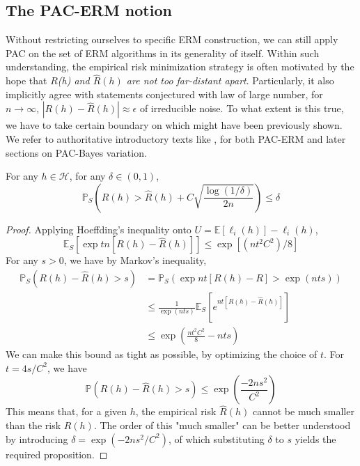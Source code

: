 \subsection{The PAC-ERM notion}

Without restricting ourselves to specific ERM construction, we can still apply PAC on the set of ERM algorithms in its generality of itself. Within such understanding, the empirical risk minimization strategy is often motivated by the hope that \textit{$R$(h) and $\hat{R}(h)$ are not too far-distant apart}. Particularly, it also implicitly agree with statements conjectured with law of large number, for $n\to\infty$, $|R(h)-\hat{R}(h)|\approx \epsilon$ of irreducible noise. To what extent is this true, we have to take certain boundary on which might have been previously shown. We refer to authoritative introductory texts like \cite{Alquier_2024}, for both PAC-ERM and later sections on PAC-Bayes variation. 

\begin{proposition}\label{prop:PAC_ERM_1}
    For any $h\in\mathcal{H}$, for any $\delta\in(0,1)$, 
    \begin{equation}
        \mathbb{P}_{S}\left( R(h) > \hat{R}(h)+ C\sqrt{\frac{\log{(1/\delta)}}{2n}}\right)\leq \delta
    \end{equation}
\end{proposition}
\begin{proof}
    Applying Hoeffding's inequality onto $U=\mathbb{E}[\ell_{i}(h)]-\ell_{i}(h)$, 
    \begin{equation}
        \mathbb{E}_{S}\left[\exp{tn[R(h)-\hat{R}(h)]}\right] \leq \exp{[(nt^2C^2)/8]}
    \end{equation}
    For any $s>0$, we have by Markov's inequality, 
    \begin{equation}
        \begin{split}
            \mathbb{P}_{S}(R(h)-\hat{R}(h)>s) 
            & = \mathbb{P}_{S} \left(\exp{nt[R(h)-R]}> \exp{(nts)}\right)\\
            & \leq \frac{1}{\exp{(nts)}} \mathbb{E}_{S}\left[e^{nt[R(h)-\hat{R}(h)]}\right]\\
            & \leq \exp{\left(\frac{nt^2C^2}{8}-nts\right)}
            \end{split}
    \end{equation}
    We can make this bound as tight as possible, by optimizing the choice of $t$. For $t=4s/C^{2}$, we have 
    \begin{equation}
        \mathbb{P}(R(h)-\hat{R}(h)>s) \leq \exp{\left(\frac{-2ns^2}{C^2}\right)}
    \end{equation}
    This means that, for a given $h$, the empirical risk $\hat{R}(h)$ cannot be much smaller than the risk $R(h)$. The order of this "much smaller" can be better understood by introducing $\delta=\exp{(-2ns^2/C^2)}$, of which substituting $\delta$ to $s$ yields the required proposition. 
\end{proof}


